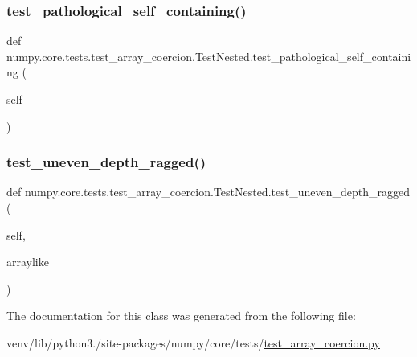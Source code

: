 \subsubsection{\texorpdfstring{test\+\_\+pathological\+\_\+self\+\_\+containing()}{test\_pathological\_self\_containing()}}
{\footnotesize\ttfamily def numpy.\+core.\+tests.\+test\+\_\+array\+\_\+coercion.\+Test\+Nested.\+test\+\_\+pathological\+\_\+self\+\_\+containing (\begin{DoxyParamCaption}\item[{}]{self }\end{DoxyParamCaption})}

\mbox{\label{classnumpy_1_1core_1_1tests_1_1test__array__coercion_1_1TestNested_aae0e18c5cdcdd75d225d26250f7eea9b}} 
\subsubsection{\texorpdfstring{test\+\_\+uneven\+\_\+depth\+\_\+ragged()}{test\_uneven\_depth\_ragged()}}
{\footnotesize\ttfamily def numpy.\+core.\+tests.\+test\+\_\+array\+\_\+coercion.\+Test\+Nested.\+test\+\_\+uneven\+\_\+depth\+\_\+ragged (\begin{DoxyParamCaption}\item[{}]{self,  }\item[{}]{arraylike }\end{DoxyParamCaption})}



The documentation for this class was generated from the following file\+:\begin{DoxyCompactItemize}
\item 
venv/lib/python3./site-\/packages/numpy/core/tests/\hyperlink{test__array__coercion_8py}{test\+\_\+array\+\_\+coercion.\+py}\end{DoxyCompactItemize}
